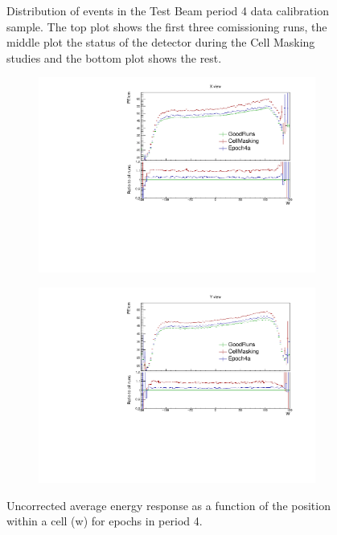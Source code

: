 \documentclass[12pt,a4paper]{article}
\begin{document}
\begin{figure}[!hbtp]
\begin{subfigure}[b]{\textwidth}
\end{subfigure}
\caption{Distribution of events in the Test Beam period 4 data calibration sample. The top plot shows the first three comissioning runs, the middle plot the status of the detector during the Cell Masking studies and the bottom plot shows the rest.}
\end{figure}

\begin{figure}[!hbtp]
\centering
\begin{subfigure}[b]{0.495\textwidth}
\centering
\includegraphics[width=\textwidth]{Plots/Attenprofs_P4Data_WPE_corr_xy_X_Combined.pdf}
\end{subfigure}
\begin{subfigure}[b]{0.495\textwidth}
\centering
\includegraphics[width=\textwidth]{Plots/Attenprofs_P4Data_WPE_corr_xy_Y_Combined.pdf}
\end{subfigure}
\caption{Uncorrected average energy response as a function of the position within a cell (w) for epochs in period 4.}
\label{figCalibhistWPE_period4}
\end{figure}
\end{document}

